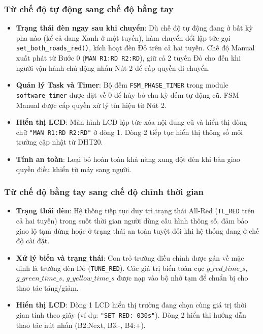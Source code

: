 \subsubsection{Từ chế độ tự động sang chế độ bằng tay}
\begin{itemize}
    \item \textbf{Trạng thái đèn ngay sau khi chuyển}: Dù chế độ tự động đang ở bất kỳ pha nào (kể cả đang Xanh ở một tuyến), hàm chuyển đổi lập tức gọi \texttt{set\_both\_roads\_red()}, kích hoạt đèn Đỏ trên cả hai tuyến. Chế độ Manual xuất phát từ Bước 0 (\texttt{MAN R1:RD R2:RD}), giữ cả 2 tuyến Đỏ cho đến khi người vận hành chủ động nhấn Nút 2 để cấp quyền di chuyển.
    \item \textbf{Quản lý Task và Timer}: Bộ đếm \texttt{FSM\_PHASE\_TIMER} trong module \texttt{software\_timer} được đặt về 0 để hủy bỏ chu kỳ đếm tự động cũ. FSM Manual được cấp quyền xử lý tín hiệu từ Nút 2.
    \item \textbf{Hiển thị LCD}: Màn hình LCD lập tức xóa nội dung cũ và hiển thị dòng chữ \texttt{"MAN  R1:RD R2:RD"} ở dòng 1. Dòng 2 tiếp tục hiển thị thông số môi trường cập nhật từ DHT20.
    \item \textbf{Tính an toàn}: Loại bỏ hoàn toàn khả năng xung đột đèn khi bàn giao quyền điều khiển từ máy sang người.
\end{itemize}

\subsubsection{Từ chế độ bằng tay sang chế độ chỉnh thời gian}
\begin{itemize}
    \item \textbf{Trạng thái đèn}: Hệ thống tiếp tục duy trì trạng thái All-Red (\texttt{TL\_RED} trên cả hai tuyến) trong suốt thời gian người dùng cấu hình thông số, đảm bảo giao lộ tạm dừng hoặc ở trạng thái an toàn tuyệt đối khi hệ thống đang ở chế độ cài đặt.
    \item \textbf{Xử lý biến và trạng thái}: Con trỏ trường điều chỉnh được gán về mặc định là trường đèn Đỏ (\texttt{TUNE\_RED}). Các giá trị biến toàn cục $g\_red\_time\_s$, $g\_green\_time\_s$, $g\_yellow\_time\_s$ được nạp vào bộ nhớ tạm để chuẩn bị cho thao tác tăng/giảm.
    \item \textbf{Hiển thị LCD}: Dòng 1 LCD hiển thị trường đang chọn cùng giá trị thời gian tính theo giây (ví dụ: \texttt{"SET RED:  030s"}). Dòng 2 hiển thị hướng dẫn thao tác nút nhấn (B2:Next, B3:-, B4:+).
\end{itemize}

